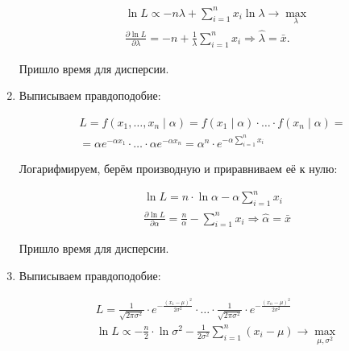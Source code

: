 \begin{sol}
\begin{enumerate}
\begin{equation*}
\begin{aligned}
& \ln L \propto -n \lambda + \sum_{i=1}^n x_i \ln \lambda \to \max_{\lambda} \\ 
& \frac{\partial \ln L}{\partial \lambda} = -n + \frac{1}{\lambda} \sum_{i=1}^n x_i  \Rightarrow \hat \lambda = \bar x.
\end{aligned}
\end{equation*}
	
Пришло время для дисперсии. 


\item Выписываем правдоподобие: 
	
	
	\begin{multline*}
	L = f(x_1, \ldots, x_n \mid \alpha) = f(x_1 \mid \alpha) \cdot \ldots \cdot f(x_n \mid \alpha) = \\ = \alpha e^{- \alpha x_1} \cdot \ldots \cdot \alpha e^{-\alpha x_n} = \alpha^n \cdot e^{-\alpha \sum_{i=1}^n x_i}
	\end{multline*}
	
	Логарифмируем, берём производную и приравниваем её к нулю:
	
	\begin{equation*}
	\begin{aligned}
	& \ln L =   n \cdot \ln \alpha - \alpha \sum_{i=1}^n x_i\\ 
	& \frac{\partial \ln L}{\partial \alpha} = \frac{n}{\alpha} - \sum_{i=1}^n x_i \Rightarrow \hat \alpha = \bar x 
	\end{aligned}
	\end{equation*}
	
	Пришло время для дисперсии. 
	


\item Выписываем правдоподобие: 

\begin{equation*}
\begin{aligned}
& L = \frac{1}{\sqrt{2 \pi \sigma^2}} \cdot e^{-\frac{(x_1 - \mu)^2}{2 \sigma^2}} \cdot \ldots \cdot \frac{1}{\sqrt{2 \pi \sigma^2}} \cdot e^{-\frac{(x_n - \mu)^2}{2 \sigma^2}} \\ 
& \ln L \propto - \frac{n}{2} \cdot \ln \sigma^2 - \frac{1}{2 \sigma^2} \sum_{i=1}^n (x_i - \mu) \to \max_{\mu, \sigma^2}		
\end{aligned}
\end{equation*}


		
\end{enumerate}	
\end{sol}



